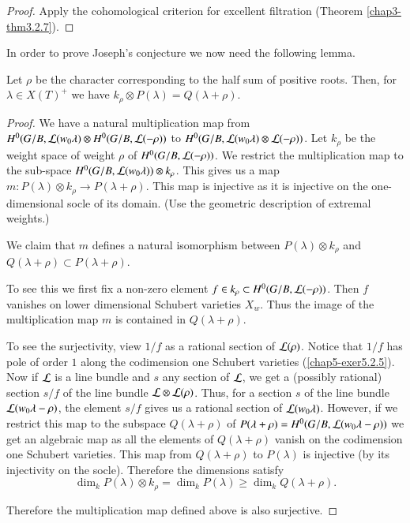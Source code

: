 \begin{proof}
Apply the cohomological criterion for excellent filtration (Theorem
\ref{chap3-thm3.2.7}). 
\end{proof}

In order to prove Joseph's conjecture we now need the following lemma.

\begin{lemma}\label{chap5-lem5.2.4}
Let $\rho$ be the character corresponding to the half sum of positive
roots. Then, for $\lambda\in X(T)^{+}$ we have $k_{\rho}\otimes
P(\lambda)=Q(\lambda+\rho)$. 
\end{lemma}

\begin{proof}
We have a natural multiplication map from
$H^{0}(G/B,\mathcal{L}(w_{0}\lambda)\otimes H^{0}(G/B,\mathcal{L}(-\rho))$ to
$H^{0}(G/B,\mathcal{L}(w_{0}\lambda)\otimes \mathcal{L}(-\rho))$. Let $k_{\rho}$ be the
weight space of weight $\rho$ of $H^{0}(G/B,\mathcal{L}(-\rho))$. We restrict
the multiplication map to the sub-space
$H^{0}(G/B,\mathcal{L}(w_{0}\lambda))\otimes k_{\rho}$. This gives us a map
$m:P(\lambda)\otimes k_{\rho}\to P(\lambda+\rho)$. This map is
injective as it is injective on the one-dimensional socle of its
domain. (Use the geometric description of extremal weights.)

We claim that $m$ defines a natural isomorphism between
$P(\lambda)\otimes k_{\rho}$ and $Q(\lambda+\rho)\subset
P(\lambda+\rho)$.

To see this we first fix a non-zero element $f\in k_{\rho}\subset
H^{0}(G/B,\mathcal{L}(-\rho))$. Then $f$ vanishes on lower dimensional Schubert
varieties $X_{w}$. Thus the image of the multiplication map $m$ is
contained in $Q(\lambda+\rho)$.

To see the surjectivity, view $1/f$ as a rational section of
$\mathcal{L}(\rho)$. Notice that $1/f$ has pole of order $1$ along the
codimension one Schubert varieties 
(\ref{chap5-exer5.2.5}). Now if $\mathcal{L}$ is a line
bundle and $s$ any section of $\mathcal{L}$, we get a (possibly rational)
section $s/f$ of the line bundle $\mathcal{L}\otimes \mathcal{L}(\rho)$. Thus, for a
section $s$ of the line bundle $\mathcal{L}(w_{0}\lambda-\rho)$, the element
$s/f$ gives us a rational section of\pageoriginale
$\mathcal{L}(w_{0}\lambda)$.\label{page53} However, if we restrict this map to the subspace
$Q(\lambda+\rho)$ of
$P(\lambda+\rho)=H^{0}(G/B,\mathcal{L}(w_{0}\lambda-\rho))$ we get an algebraic
map as all the elements of $Q(\lambda+\rho)$ vanish on the codimension
one Schubert varieties. This map from $Q(\lambda+\rho)$ to
$P(\lambda)$ is injective (by its injectivity on  the
socle). Therefore the dimensions satisfy
$$
\dim_{k}P(\lambda)\otimes k_{\rho}=\dim_{k}P(\lambda)\geq
\dim_{k}Q(\lambda+\rho). 
$$

Therefore the multiplication map defined above is also surjective.
\end{proof}

